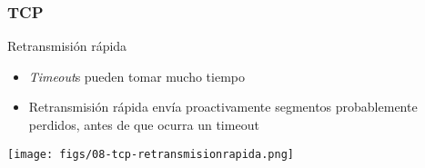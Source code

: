 \documentclass[letter]{beamer}
\begin{document}
\begin{frame}
  \frametitle{TCP}
  Retransmisión rápida
  \begin{itemize}
    \item {\em Timeout}s pueden tomar mucho tiempo
    \item Retransmisión rápida envía proactivamente segmentos probablemente perdidos,
          antes de que ocurra un timeout
  \end{itemize}
  
  \begin{center}
    \texttt{[image: figs/08-tcp-retransmisionrapida.png]}
  \end{center}

\end{frame}
  
\end{document}
